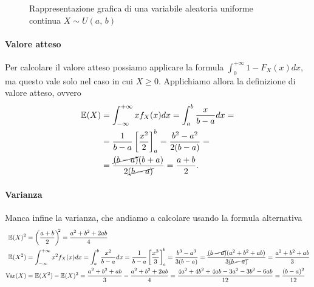 \begin{figure}[h]
{{
    }
}
    \caption{Rappresentazione grafica di una variabile aleatoria uniforme continua $X \sim U{(a, \, b)}$}
    \label{fig:mod_unif_cont}
\end{figure}

\paragraph{Valore atteso}
Per calcolare il {valore atteso} possiamo applicare la formula $\int_0^{+\infty} 1 - F_X(x) dx$, ma questo vale solo nel caso in cui $X \geq 0$.
Applichiamo allora la definizione di valore atteso, ovvero
\begin{align*}
\mathbb{E}(X) &= \int_{-\infty}^{+\infty} x f_X(x) dx = \int_a^b \frac{x}{b-a} dx = \\ 
&= \frac{1}{b-a} \left [\frac{x^2}{2} \right ]_a^b = \frac{b^2 - a^2}{2 (b-a)} = \\
&= \frac{\cancel{(b-a)}(b+a)}{2 \cancel{(b-a)}} = \frac{a+b}{2}.
\end{align*}

\paragraph{Varianza}
Manca infine la {varianza}, che andiamo a calcolare usando la formula alternativa
\begin{align*}
\mathbb{E}(X)^2 &= \left (\frac{a+b}{2} \right) ^ {\!\!2} = \frac{a^2 + b^2 + 2ab}{4} \\
%
\mathbb{E}(X^2) &= \int_{-\infty}^{+\infty} x^2 f_X(x) dx = \int_a^b \frac{x^2}{b-a} dx = \frac{1}{b-a} \left [\frac{x^3}{3} \right ]_a^b = \frac{b^3 - a^3}{3 (b-a)} = \frac{\cancel{(b-a)}(a^2 + b^2 + ab)}{3 \cancel{(b-a)}} = \frac{a^2 + b^2 + ab}{3} \\
%
\operatorname{Var}(X) &= \mathbb{E}(X^2) - \mathbb{E}(X)^2 = \frac{a^2 + b^2 + ab}{3} - \frac{a^2 + b^2 + 2ab}{4} = \frac{4a^2 + 4b^2 + 4ab - 3a^2 - 3b^2 - 6ab}{12} = \frac{(b-a)^2}{12}
\end{align*}

